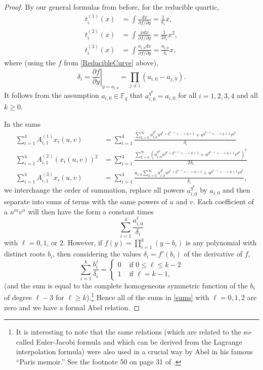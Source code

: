 \documentclass[12pt]{amsart}
\theoremstyle{theorem}
\newcommand{\FF}{\mathbb{F}}
\begin{document}
\begin{proof}
By our general formulas from before, for the reducible quartic, 
\begin{align*}
t_i^{(1)}(x) &= \int \frac{dx}{\partial f/\partial y} = \frac{1}{\delta_i} x,\\
t_i^{(2)}(x) &= \int \frac{x dx}{\partial f/\partial y} = \frac{1}{2 \delta_i} x^2,\\
t_i^{(3)}(x) &= \int \frac{a_{i,0} dx}{\partial f/\partial y}  = \frac{a_{i,0}}{\delta_i} x,
\end{align*}
where (using the $f$ from \eqref{ReducibleCurve} above), 
$$\delta_i = \left.\frac{\partial f}{\partial y}\right|_{y = a_{i,0}} = \prod_{j \ne i}(a_{i,0} - a_{j,0}).$$
It follows from the assumption $a_{i,0} \in \FF_q$ that $a_{i,0}^{q^k} = a_{i,0}$ 
for all $i =1,2,3,4$ and all $k \ge 0$.   

In the sums 
\begin{align*}  
\sum_{i=1}^4 A_{i,1}^{(1)} x_i(u,v) &= \sum_{i=1}^4  \frac{{\displaystyle \sum_{k=0}^\infty a_{i,0}^{q^k} u^{q^k+q^{k-1}+\cdots+q+1} + u^{q^{k-1} + \cdots + q+1} v^{q^k}}}{\delta_i}\\
\sum_{i=1}^4 A_{i,1}^{(2)} (x_i(u,v))^2 &= \sum_{i=1}^4 \frac{{\displaystyle \sum_{k=0}^\infty (a_{i,0}^{q^k} u^{q^k+q^{k-1}+\cdots+q+1} + u^{q^{k-1} + \cdots + q+1} v^{q^k})^2}}{2 \delta_i}\\
\sum_{i=1}^4 A_{i,1}^{(3)} x_i(u,v) &= \sum_{i=1}^4 \frac{a_{i,0} {\displaystyle \sum_{k=0}^\infty a_{i,0}^{q^k} u^{q^k+q^{k-1}+\cdots+q+1} + u^{q^{k-1} + \cdots + q+1} v^{q^k}}}{\delta_i},
\end{align*}
we interchange the order of summation, replace all powers $a_{i,0}^{q^k}$ by $a_{i,0}$ and then separate into sums of terms with the 
same powers of $u$ and $v$.  Each coefficient of a $u^m v^n$ 
will then have the form a constant times
\begin{equation}
\label{sums}
\sum_{i=1}^4 \frac{a_{i,0}^\ell}{\delta_i}
\end{equation}
with $\ell = 0, 1$, or $2$.  However, if $f(y) = \prod_{i=1}^k (y - b_i)$ is any polynomial with distinct roots $b_i$, then considering
the values $\delta_i = f'(b_i)$ of the derivative of $f$, 
$$\sum_{i=1}^k \frac{b_i^\ell}{\delta_i} = \begin{cases}  0  &  \text{ if } 0 \le \ell \le k - 2\\
                                                                                     1 &  \text{ if }  \ell = k - 1, 
                                                                                     \end{cases}$$
(and the sum is equal to the complete homogeneous symmetric function of the $b_i$ of degree $\ell - 3$ for $\ell \ge k$).\footnote{It is interesting to note that the same relations (which are related to the so-called Euler-Jacobi formula and which
can be derived from the Lagrange interpolation formula) were also used in a crucial
way by Abel in his famous ``Paris memoir.''  See the footnote 50 on page 31 of \cite{LitAbel}.}
Hence all of the sums in \eqref{sums} with $\ell = 0,1,2$ are zero and we have a formal Abel relation.
\end{proof}
\end{document}
